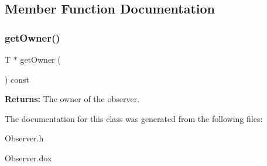 \subsection{Member Function Documentation}
\mbox{\label{classKatabatic_1_1Observer_ac29b8f99d632058c95784fd7233b8474}} 
\subsubsection{\texorpdfstring{get\+Owner()}{getOwner()}}
{\footnotesize\ttfamily T $\ast$ get\+Owner (\begin{DoxyParamCaption}{ }\end{DoxyParamCaption}) const\hspace{0.3cm}{\ttfamily [inline]}}

{\bfseries Returns\+:} The owner of the observer. 

The documentation for this class was generated from the following files\+:\begin{DoxyCompactItemize}
\item 
Observer.\+h\item 
Observer.\+dox\end{DoxyCompactItemize}
